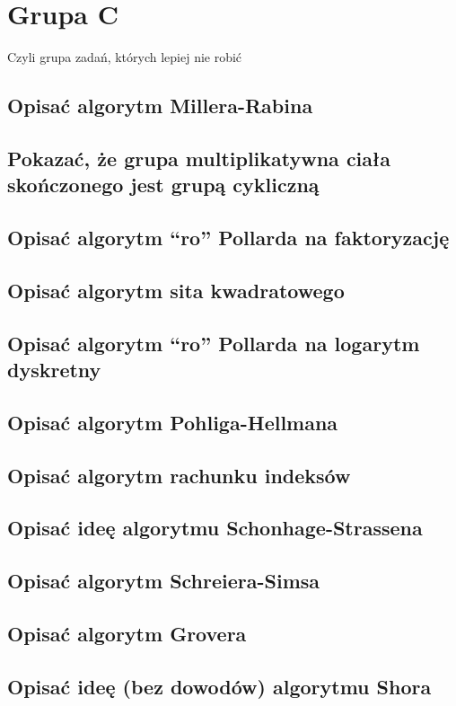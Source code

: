 \section{Grupa C}
Czyli grupa zadań, których lepiej nie robić
\subsection{Opisać algorytm Millera-Rabina}



\subsection{Pokazać, że grupa multiplikatywna ciała skończonego jest grupą cykliczną}


\subsection{Opisać algorytm “ro” Pollarda na faktoryzację}



\subsection{Opisać algorytm sita kwadratowego}



\subsection{Opisać algorytm “ro” Pollarda na logarytm dyskretny}




\subsection{Opisać algorytm Pohliga-Hellmana}



\subsection{Opisać algorytm rachunku indeksów}



\subsection{Opisać ideę algorytmu Schonhage-Strassena}



\subsection{Opisać algorytm Schreiera-Simsa}



\subsection{Opisać algorytm Grovera}



\subsection{Opisać ideę (bez dowodów) algorytmu Shora}
